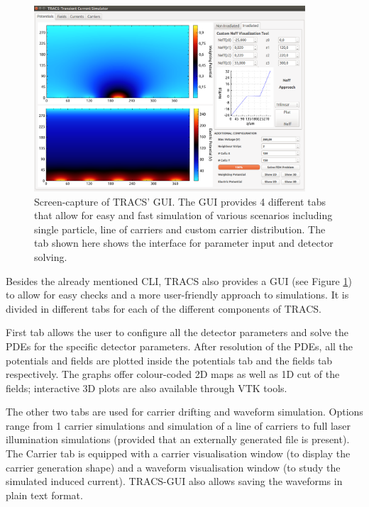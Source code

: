 \begin{figure}[H]
	\includegraphics[width=0.9\textwidth]{TRACS_CNVT.png}
	\caption{Screen-capture of TRACS' GUI. The GUI provides 4 different tabs that allow for easy and fast simulation of various scenarios including single particle, line of carriers and custom carrier distribution. The tab shown here shows the interface for parameter input and detector solving.}
	\label{fig:TRACSGUI}
\end{figure}

Besides the already mentioned CLI, TRACS also provides a GUI (see Figure \ref{fig:TRACSGUI}) to allow for easy checks and a more user-friendly approach to simulations. It is divided in different tabs for each of the different components of TRACS.

First tab allows the user to configure all the detector parameters and solve the PDEs for the specific detector parameters. After resolution of the PDEs, all the potentials and fields are plotted inside the potentials tab and the fields tab respectively. The graphs offer colour-coded 2D maps as well as 1D cut of the fields; interactive 3D plots are also available through VTK tools.

The other two tabs are used for carrier drifting and waveform simulation. Options range from 1 carrier simulations and simulation of a line of carriers to full laser illumination simulations (provided that an externally generated file is present). The Carrier tab is equipped with a carrier visualisation window (to display the carrier generation shape) and a waveform visualisation window (to study the simulated induced current). TRACS-GUI also allows saving the waveforms in plain text format.

